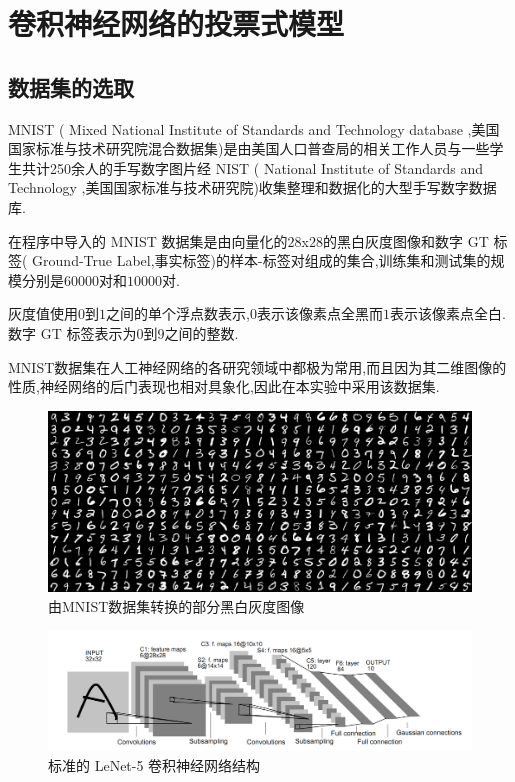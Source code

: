 \chapter{卷积神经网络的投票式模型}

\section{数据集的选取}

MNIST ( Mixed National Institute of Standards and Technology database ,美国国家标准与技术研究院混合数据集)是由美国人口普查局的相关工作人员与一些学生共计250余人的手写数字图片经 NIST ( National Institute of Standards and Technology ,美国国家标准与技术研究院)收集整理和数据化的大型手写数字数据库.

在程序中导入的 MNIST 数据集是由向量化的$28$x$28$的黑白灰度图像和数字 GT 标签( Ground-True Label,事实标签)的样本-标签对组成的集合,训练集和测试集的规模分别是$60000$对和$10000$对.

灰度值使用$0$到$1$之间的单个浮点数表示,$0$表示该像素点全黑而$1$表示该像素点全白.数字 GT 标签表示为$0$到$9$之间的整数.

MNIST数据集在人工神经网络的各研究领域中都极为常用,而且因为其二维图像的性质,神经网络的后门表现也相对具象化,因此在本实验中采用该数据集.
\begin{figure}
	\centering
	\includegraphics[scale=0.4]{Figures/mnist.png}
	\caption{由MNIST数据集转换的部分黑白灰度图像}
\end{figure}
\begin{figure}
	\centering
	\includegraphics[scale=0.35]{Figures/lenet.png}
	\caption{标准的 LeNet-5 卷积神经网络结构}
\end{figure}

